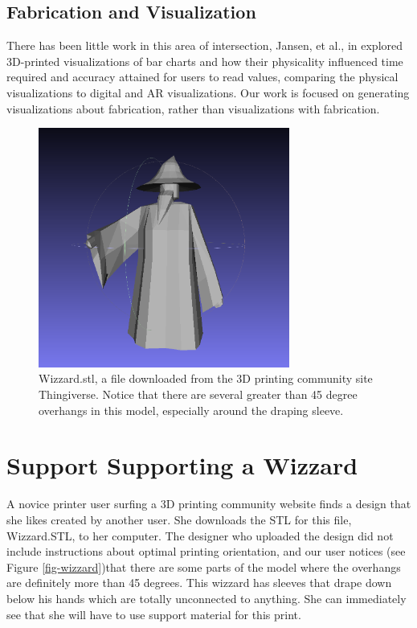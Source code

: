 \documentclass{sigchi}
\begin{document}
\subsection{Fabrication and Visualization}
There has been little work in this area of intersection, Jansen, et al., in \cite{jansen-physvis} explored 3D-printed visualizations of bar charts and how their physicality influenced time required and accuracy attained for users to read values, comparing the physical visualizations to digital and AR visualizations.  Our work is focused on generating visualizations about fabrication, rather than visualizations with fabrication.

\begin{figure}
\centering
\includegraphics[width=3.25in]{images/wizzard.png}
\caption{Wizzard.stl, a file downloaded from the 3D printing community site Thingiverse.  Notice that there are several greater than 45 degree overhangs in this model, especially around the draping sleeve.}
\label{fig:wizzard}
\end{figure}

\section{Support Supporting a Wizzard}
A novice printer user surfing a 3D printing community website finds a design that she likes created by another user.  She downloads the STL for this file, Wizzard.STL, to her computer.  The designer who uploaded the design did not include instructions about optimal printing orientation, and our user notices (see Figure \ref{fig-wizzard})that there are some parts of the model where the overhangs are definitely more than 45 degrees.  This wizzard has sleeves that drape down below his hands which are totally unconnected to anything.  She can immediately see that she will have to use support material for this print.
\end{document}

